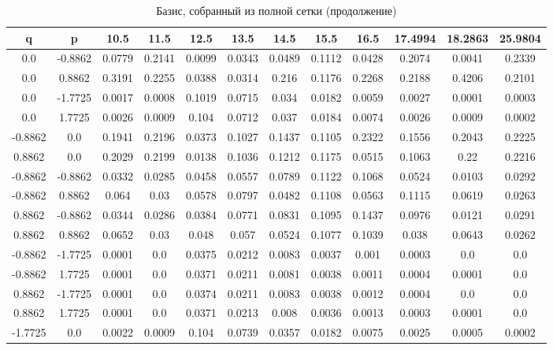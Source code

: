 \documentclass[a4paper,14pt]{extarticle}
\begin{document}
\begin{landscape}
\begin{table}[H]
\centering
\caption{Базис, собранный из полной сетки (продолжение)}
\begin{tabular}{|c|c|*{10}{c}|}
\hline
q       & p       & 10.5   & 11.5   & 12.5   & 13.5   & 14.5   & 15.5   & 16.5   & 17.4994 & 18.2863 & 25.9804 \\ 
\hline
0.0     & -0.8862 & 0.0779 & 0.2141 & 0.0099 & 0.0343 & 0.0489 & 0.1112 & 0.0428 & 0.2074  & 0.0041  & 0.2339 \\  
0.0     & 0.8862  & 0.3191 & 0.2255 & 0.0388 & 0.0314 & 0.216  & 0.1176 & 0.2268 & 0.2188  & 0.4206  & 0.2101 \\  
0.0     & -1.7725 & 0.0017 & 0.0008 & 0.1019 & 0.0715 & 0.034  & 0.0182 & 0.0059 & 0.0027  & 0.0001  & 0.0003 \\  
0.0     & 1.7725  & 0.0026 & 0.0009 & 0.104  & 0.0712 & 0.037  & 0.0184 & 0.0074 & 0.0026  & 0.0009  & 0.0002 \\  
-0.8862 & 0.0     & 0.1941 & 0.2196 & 0.0373 & 0.1027 & 0.1437 & 0.1105 & 0.2322 & 0.1556  & 0.2043  & 0.2225 \\  
0.8862  & 0.0     & 0.2029 & 0.2199 & 0.0138 & 0.1036 & 0.1212 & 0.1175 & 0.0515 & 0.1063  & 0.22    & 0.2216 \\  
-0.8862 & -0.8862 & 0.0332 & 0.0285 & 0.0458 & 0.0557 & 0.0789 & 0.1122 & 0.1068 & 0.0524  & 0.0103  & 0.0292 \\  
-0.8862 & 0.8862  & 0.064  & 0.03   & 0.0578 & 0.0797 & 0.0482 & 0.1108 & 0.0563 & 0.1115  & 0.0619  & 0.0263 \\  
0.8862  & -0.8862 & 0.0344 & 0.0286 & 0.0384 & 0.0771 & 0.0831 & 0.1095 & 0.1437 & 0.0976  & 0.0121  & 0.0291 \\  
0.8862  & 0.8862  & 0.0652 & 0.03   & 0.048  & 0.057  & 0.0524 & 0.1077 & 0.1039 & 0.038   & 0.0643  & 0.0262 \\  
-0.8862 & -1.7725 & 0.0001 & 0.0    & 0.0375 & 0.0212 & 0.0083 & 0.0037 & 0.001  & 0.0003  & 0.0     & 0.0    \\      
-0.8862 & 1.7725  & 0.0001 & 0.0    & 0.0371 & 0.0211 & 0.0081 & 0.0038 & 0.0011 & 0.0004  & 0.0001  & 0.0    \\      
0.8862  & -1.7725 & 0.0001 & 0.0    & 0.0374 & 0.0211 & 0.0083 & 0.0038 & 0.0012 & 0.0004  & 0.0     & 0.0    \\      
0.8862  & 1.7725  & 0.0001 & 0.0    & 0.0371 & 0.0213 & 0.008  & 0.0036 & 0.0013 & 0.0003  & 0.0001  & 0.0    \\      
-1.7725 & 0.0     & 0.0022 & 0.0009 & 0.104  & 0.0739 & 0.0357 & 0.0182 & 0.0075 & 0.0025  & 0.0005  & 0.0002 \\  

\end{tabular}
\end{table}
\end{landscape}
\end{document}
